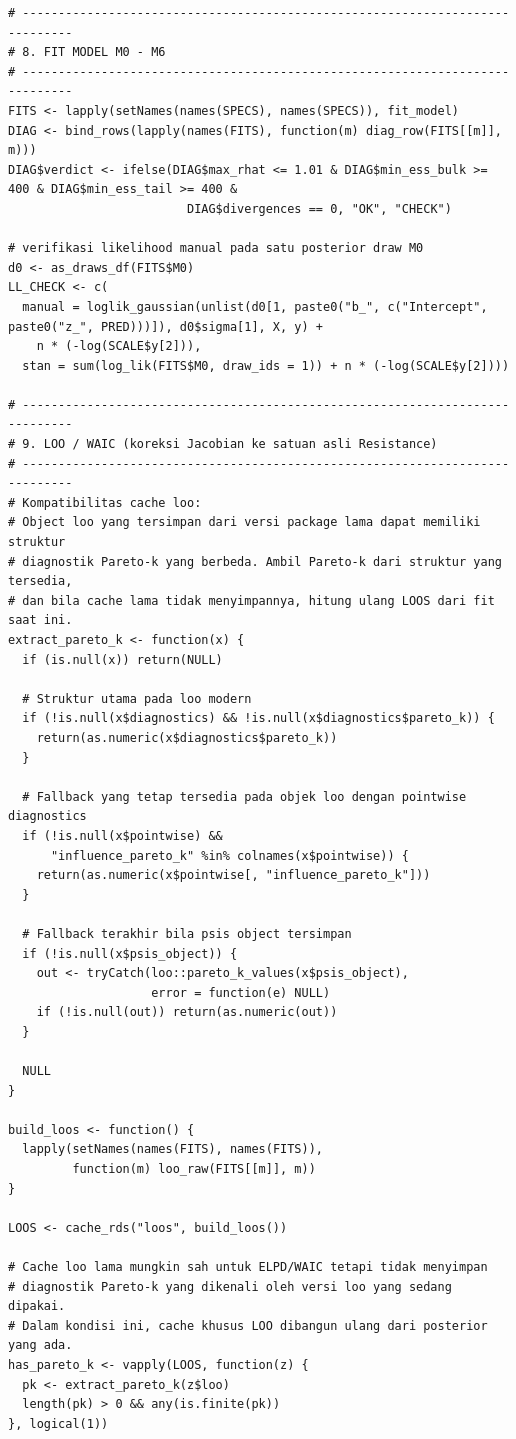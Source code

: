 \documentclass[
]{article}
\begin{document}
\begin{verbatim}
# -----------------------------------------------------------------------------
# 8. FIT MODEL M0 - M6
# -----------------------------------------------------------------------------
FITS <- lapply(setNames(names(SPECS), names(SPECS)), fit_model)
DIAG <- bind_rows(lapply(names(FITS), function(m) diag_row(FITS[[m]], m)))
DIAG$verdict <- ifelse(DIAG$max_rhat <= 1.01 & DIAG$min_ess_bulk >= 400 & DIAG$min_ess_tail >= 400 &
                         DIAG$divergences == 0, "OK", "CHECK")

# verifikasi likelihood manual pada satu posterior draw M0
d0 <- as_draws_df(FITS$M0)
LL_CHECK <- c(
  manual = loglik_gaussian(unlist(d0[1, paste0("b_", c("Intercept", paste0("z_", PRED)))]), d0$sigma[1], X, y) +
    n * (-log(SCALE$y[2])),
  stan = sum(log_lik(FITS$M0, draw_ids = 1)) + n * (-log(SCALE$y[2])))

# -----------------------------------------------------------------------------
# 9. LOO / WAIC (koreksi Jacobian ke satuan asli Resistance)
# -----------------------------------------------------------------------------
# Kompatibilitas cache loo:
# Object loo yang tersimpan dari versi package lama dapat memiliki struktur
# diagnostik Pareto-k yang berbeda. Ambil Pareto-k dari struktur yang tersedia,
# dan bila cache lama tidak menyimpannya, hitung ulang LOOS dari fit saat ini.
extract_pareto_k <- function(x) {
  if (is.null(x)) return(NULL)

  # Struktur utama pada loo modern
  if (!is.null(x$diagnostics) && !is.null(x$diagnostics$pareto_k)) {
    return(as.numeric(x$diagnostics$pareto_k))
  }

  # Fallback yang tetap tersedia pada objek loo dengan pointwise diagnostics
  if (!is.null(x$pointwise) &&
      "influence_pareto_k" %in% colnames(x$pointwise)) {
    return(as.numeric(x$pointwise[, "influence_pareto_k"]))
  }

  # Fallback terakhir bila psis object tersimpan
  if (!is.null(x$psis_object)) {
    out <- tryCatch(loo::pareto_k_values(x$psis_object),
                    error = function(e) NULL)
    if (!is.null(out)) return(as.numeric(out))
  }

  NULL
}

build_loos <- function() {
  lapply(setNames(names(FITS), names(FITS)),
         function(m) loo_raw(FITS[[m]], m))
}

LOOS <- cache_rds("loos", build_loos())

# Cache loo lama mungkin sah untuk ELPD/WAIC tetapi tidak menyimpan
# diagnostik Pareto-k yang dikenali oleh versi loo yang sedang dipakai.
# Dalam kondisi ini, cache khusus LOO dibangun ulang dari posterior yang ada.
has_pareto_k <- vapply(LOOS, function(z) {
  pk <- extract_pareto_k(z$loo)
  length(pk) > 0 && any(is.finite(pk))
}, logical(1))


\end{verbatim}
\end{document}
